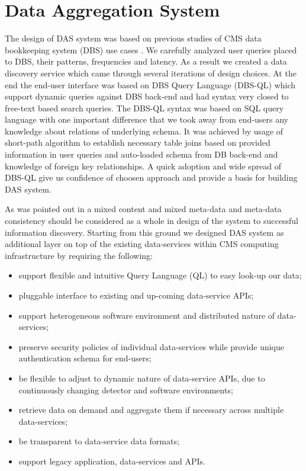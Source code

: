 \documentclass[a4paper]{jpconf}
\begin{document}
\section{Data Aggregation System\label{DAS}}
The design of DAS system was based on previous studies of CMS 
data bookkeeping system (DBS) use cases \cite{DBS, DBS07}. We carefully analyzed user
queries placed to DBS, their patterns, frequencies and latency. As a result
we created a data discovery service \cite{DD} which came through several iterations
of design choices. At the end the end-user interface was based on DBS 
Query Language (DBS-QL)\cite{DBS-QL} which support dynamic queries against
DBS back-end and had syntax very closed to free-text based search queries. 
The DBS-QL \cite{DBS-QL} syntax was based on SQL query language with one important
difference that we took away from end-users any knowledge about relations of underlying schema.
It was achieved by usage of short-path algorithm to establish necessary
table joins based on provided information in user queries and auto-loaded
schema from DB back-end and knowledge of foreign key relationships.
A quick adoption and wide spread of DBS-QL give us confidence of choosen approach 
and provide a basis for building DAS system.

As was pointed out in \cite{Arms} a mixed content and 
mixed meta-data and meta-data consistency should be considered as a whole in design 
of the system to successful information discovery. 
Starting from this ground we designed DAS system as
additional layer on top of the existing data-services
within CMS computing infrastructure by requiring the following:
\begin{itemize}
\item support flexible and intuitive Query Language (QL) to easy look-up our
data;
\item pluggable interface to existing and up-coming data-service APIs;
\item support heterogeneous software environment and distributed nature of data-services;
\item preserve security policies of individual data-services while provide unique
authentication schema for end-users;
\item be flexible to adjust to dynamic nature of data-service APIs, 
due to continuously changing detector and software environments;
\item retrieve data on demand and aggregate them if necessary across
multiple data-services;
\item be transparent to data-service data formats;
\item support legacy application, data-services and APIs.
\end{itemize}
\end{document}
